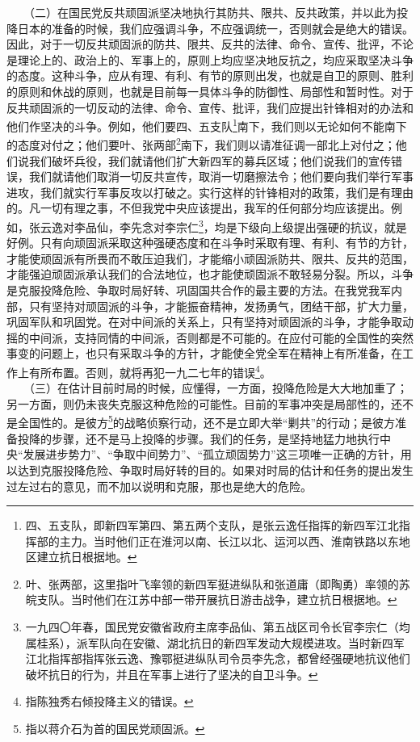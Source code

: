 \documentclass[cn,11pt,chinese]{elegantbook}
\begin{document}
　　（二）在国民党反共顽固派坚决地执行其防共、限共、反共政策，并以此为投降日本的准备的时候，我们应强调斗争，不应强调统一，否则就会是绝大的错误。因此，对于一切反共顽固派的防共、限共、反共的法律、命令、宣传、批评，不论是理论上的、政治上的、军事上的，原则上均应坚决地反抗之，均应采取坚决斗争的态度。这种斗争，应从有理、有利、有节的原则出发，也就是自卫的原则、胜利的原则和休战的原则，也就是目前每一具体斗争的防御性、局部性和暂时性。对于反共顽固派的一切反动的法律、命令、宣传、批评，我们应提出针锋相对的办法和他们作坚决的斗争。例如，他们要四、五支队\footnote[3]{ 四、五支队，即新四军第四、第五两个支队，是张云逸任指挥的新四军江北指挥部的主力。当时他们正在淮河以南、长江以北、运河以西、淮南铁路以东地区建立抗日根据地。}南下，我们则以无论如何不能南下的态度对付之；他们要叶、张两部\footnote[4]{ 叶、张两部，这里指叶飞率领的新四军挺进纵队和张道庸（即陶勇）率领的苏皖支队。当时他们在江苏中部一带开展抗日游击战争，建立抗日根据地。}南下，我们则以请准征调一部北上对付之；他们说我们破坏兵役，我们就请他们扩大新四军的募兵区域；他们说我们的宣传错误，我们就请他们取消一切反共宣传，取消一切磨擦法令；他们要向我们举行军事进攻，我们就实行军事反攻以打破之。实行这样的针锋相对的政策，我们是有理由的。凡一切有理之事，不但我党中央应该提出，我军的任何部分均应该提出。例如，张云逸对李品仙，李先念对李宗仁\footnote[5]{ 一九四〇年春，国民党安徽省政府主席李品仙、第五战区司令长官李宗仁（均属桂系），派军队向在安徽、湖北抗日的新四军发动大规模进攻。当时新四军江北指挥部指挥张云逸、豫鄂挺进纵队司令员李先念，都曾经强硬地抗议他们破坏抗日的行为，并且在军事上进行了坚决的自卫斗争。}，均是下级向上级提出强硬的抗议，就是好例。只有向顽固派采取这种强硬态度和在斗争时采取有理、有利、有节的方针，才能使顽固派有所畏而不敢压迫我们，才能缩小顽固派防共、限共、反共的范围，才能强迫顽固派承认我们的合法地位，也才能使顽固派不敢轻易分裂。所以，斗争是克服投降危险、争取时局好转、巩固国共合作的最主要的方法。在我党我军内部，只有坚持对顽固派的斗争，才能振奋精神，发扬勇气，团结干部，扩大力量，巩固军队和巩固党。在对中间派的关系上，只有坚持对顽固派的斗争，才能争取动摇的中间派，支持同情的中间派，否则都是不可能的。在应付可能的全国性的突然事变的问题上，也只有采取斗争的方针，才能使全党全军在精神上有所准备，在工作上有所布置。否则，就将再犯一九二七年的错误\footnote[6]{ 指陈独秀右倾投降主义的错误。}。\\
　　（三）在估计目前时局的时候，应懂得，一方面，投降危险是大大地加重了；另一方面，则仍未丧失克服这种危险的可能性。目前的军事冲突是局部性的，还不是全国性的。是彼方\footnote[7]{ 指以蒋介石为首的国民党顽固派。}的战略侦察行动，还不是立即大举“剿共”的行动；是彼方准备投降的步骤，还不是马上投降的步骤。我们的任务，是坚持地猛力地执行中央“发展进步势力”、“争取中间势力”、“孤立顽固势力”这三项唯一正确的方针，用以达到克服投降危险、争取时局好转的目的。如果对时局的估计和任务的提出发生过左过右的意见，而不加以说明和克服，那也是绝大的危险。\\
\end{document}
